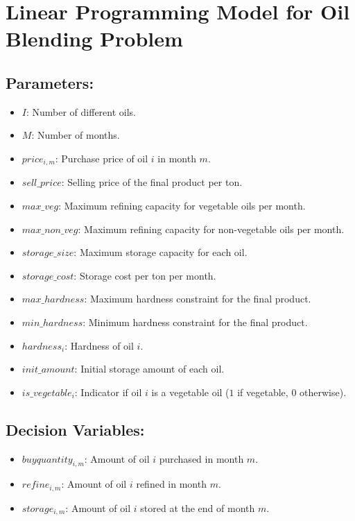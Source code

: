 \documentclass{article}
\begin{document}
\section*{Linear Programming Model for Oil Blending Problem}

\subsection*{Parameters:}
\begin{itemize}
    \item $I$: Number of different oils.
    \item $M$: Number of months.
    \item $price_{i,m}$: Purchase price of oil $i$ in month $m$.
    \item $sell\_price$: Selling price of the final product per ton.
    \item $max\_veg$: Maximum refining capacity for vegetable oils per month.
    \item $max\_non\_veg$: Maximum refining capacity for non-vegetable oils per month.
    \item $storage\_size$: Maximum storage capacity for each oil.
    \item $storage\_cost$: Storage cost per ton per month.
    \item $max\_hardness$: Maximum hardness constraint for the final product.
    \item $min\_hardness$: Minimum hardness constraint for the final product.
    \item $hardness_{i}$: Hardness of oil $i$.
    \item $init\_amount$: Initial storage amount of each oil.
    \item $is\_vegetable_{i}$: Indicator if oil $i$ is a vegetable oil ($1$ if vegetable, $0$ otherwise).
\end{itemize}

\subsection*{Decision Variables:}
\begin{itemize}
    \item $buyquantity_{i,m}$: Amount of oil $i$ purchased in month $m$.
    \item $refine_{i,m}$: Amount of oil $i$ refined in month $m$.
    \item $storage_{i,m}$: Amount of oil $i$ stored at the end of month $m$.
\end{itemize}
\end{document}
